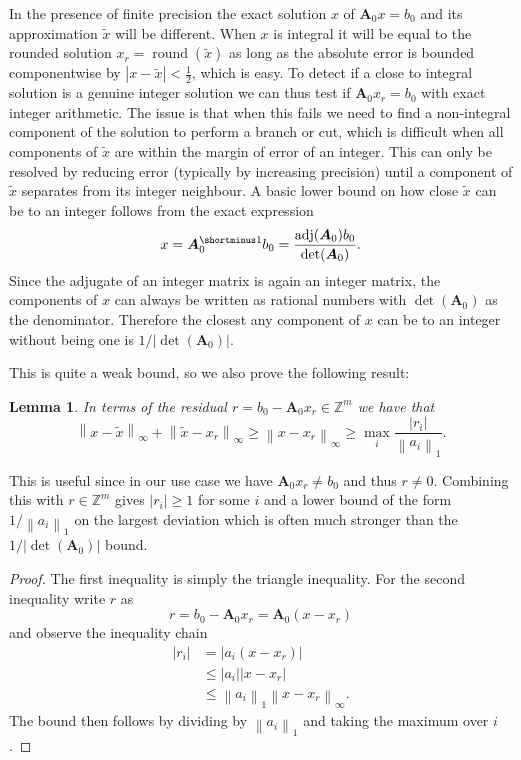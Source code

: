 \documentclass[a4paper, 12pt]{article}
\newcommand{\Z} {\mathbb{Z}}
\newcommand{\minv} { {\shortminus1} }
\newcommand{\abs}[1]{\left\lvert#1\right\rvert}
\newcommand{\norm}[1]{\left\lVert#1\right\rVert}
\DeclareMathOperator{\round}{round}
\DeclareMathOperator{\adj}{adj}
\newtheorem{lemma}{Lemma}[section]
\begin{document}
In the presence of finite precision the exact solution $x$ of $\bm{A}_0 x = b_0$ and its approximation $\tilde{x}$ will be different. When $x$ is integral it will be equal to the rounded solution $x_r = \round(\tilde{x})$ as long as the absolute error is bounded componentwise by $\abs{x - \tilde{x}} < \frac{1}{2}$, which is easy. To detect if a close to integral solution is a genuine integer solution we can thus test if $\bm{A}_0 x_r = b_0$ with exact integer arithmetic. The issue is that when this fails we need to find a non-integral component of the solution to perform a branch or cut, which is difficult when all components of $\tilde{x}$ are within the margin of error of an integer.
This can only be resolved by reducing error (typically by increasing precision) until a component of $\tilde{x}$ separates from its integer neighbour. A basic lower bound on how close $\tilde{x}$ can be to an integer follows from the exact expression
\begin{equation*}
x = \bm{A}_0^\minv b_0 = \frac{\adj(\bm{A}_0) b_0}{\det(\bm{A}_0)}.
\end{equation*}
Since the adjugate of an integer matrix is again an integer matrix, the components of $x$ can always be written as rational numbers with $\det(\bm{A}_0)$ as the denominator. Therefore the closest any component of $x$ can be to an integer without being one is $1 / \abs{\det(\bm{A}_0)}$.

This is quite a weak bound, so we also prove the following result:

\begin{lemma}
In terms of the residual $r = b_0 - \bm{A}_0 x_r \in \Z^m$ we have that
\begin{equation*}
\norm{x - \tilde{x}}_\infty + \norm{\tilde{x} - x_r}_\infty \geq \norm{x - x_r}_\infty \geq \max_i \frac{\abs{r_i}}{\norm{a_i}_1}.
\end{equation*}
\end{lemma}
This is useful since in our use case we have $\bm{A}_0 x_r \neq b_0$ and thus $r \neq 0$. Combining this with $r \in \Z^m$ gives $\abs{r_i} \geq 1$ for some $i$ and a lower bound of the form $1 / \norm{a_i}_1$ on the largest deviation which is often much stronger than the $1 / \abs{\det(\bm{A}_0)}$ bound.

\begin{proof}
The first inequality is simply the triangle inequality. For the second inequality write $r$ as
\begin{equation*}
r = b_0 - \bm{A}_0 x_r = \bm{A}_0\left(x - x_r\right)
\end{equation*}
and observe the inequality chain
\begin{align*}
\abs{r_i}
&= \abs{a_i \left(x - x_r\right)} \\
&\leq \abs{a_i} \abs{x - x_r} \\
&\leq \norm{a_i}_1 \norm{x - x_r}_\infty.
\end{align*}
The bound then follows by dividing by $\norm{a_i}_1$ and taking the maximum over $i$.
\end{proof}
\end{document}

